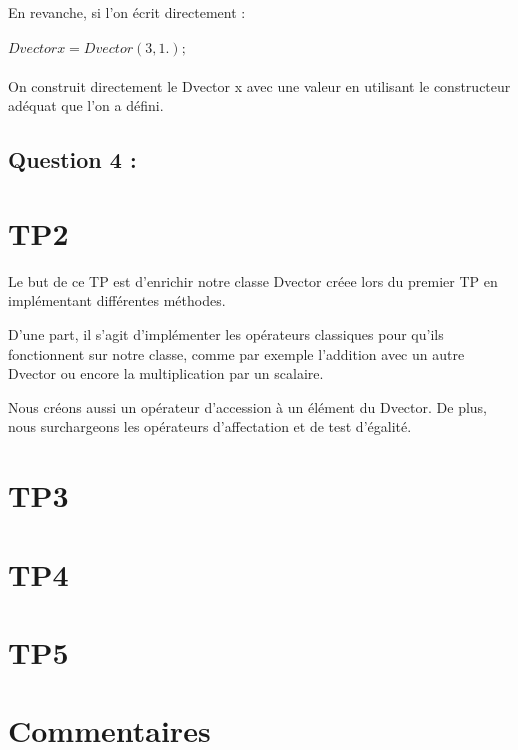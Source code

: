 \documentclass{article}
\begin{document}
En revanche, si l'on écrit directement : \\ \\ $Dvector x = Dvector(3, 1.);$ \\ \\

On construit directement le Dvector x avec une valeur en utilisant le constructeur adéquat que l'on a défini.

\subsection{Question 4 :}

\section{TP2}

Le but de ce TP est d'enrichir notre classe Dvector créee lors du premier TP en implémentant différentes méthodes.

D'une part, il s'agit d'implémenter les opérateurs classiques pour qu'ils fonctionnent sur notre classe, comme par exemple l'addition avec un autre Dvector ou encore la multiplication par un scalaire.

Nous créons aussi un opérateur d'accession à un élément du Dvector. De plus, nous surchargeons les opérateurs d'affectation et de test d'égalité.

\section{TP3}

\section{TP4}

\section{TP5}

\section{Commentaires}
\end{document}
